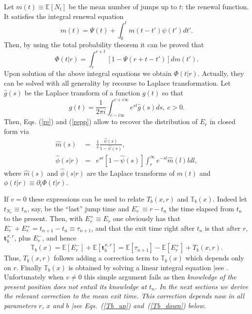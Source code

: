 \documentclass[english,aps,a4paper,twocolumn,showpacs,showkeys,amsfonts,amsmath,amssymb,amscd,nofootinbib]{revtex4}
\newcommand{\1}{\'\i}
\newcommand{\EE}{\mathbb{E}}
\newcommand{\TT}{\mathbb{T}}\newcommand{\FF}{\mathbb{F}}
\def\eq{\equiv}
\def\p{\partial}
\begin{document}
   Let  $m(t)\equiv \EE[N_t]$   be  the  mean
number of jumps up to $t$:  the renewal function. It satisfies
the integral renewal equation
\begin{equation}
m(t)=  \Psi(t) +\int_0^t  m(t-t')\psi(t')d  t'. \label{re}%
\end{equation}
 Then, by using the total
probability theorem   it can be proved  that
\begin{equation}
\Phi(t|r) = \int^{r+ t }_{r}\left[1- \Psi(r+ t-t')\right]d  m(t').
\label{repp}%
\end{equation}  Upon solution of the  above
  integral  equations we obtain $\Phi(t|r)$. Actually, they  can be solved
  with all generality
  by recourse to   Laplace
  transformation.   Let $\hat g(s)$ be   the Laplace
transform of a function $g(t)$ so that
\begin{equation}  g(t) =\frac{1}{2\pi i}
\int_{c-i\infty}^{c+i\infty} e^{ st} \hat g(s)  d  s,\ c>0.
\label{def_m}%
\end{equation}
  Then,    Eqs.  (\ref{re}) and (\ref{repp}) allow  to  recover the
  distribution of $E_r$ in closed form via
\begin{subequations}
\label{hat_phi} 
\begin{eqnarray}
\hat m(s)&=&\frac{1}{s} \frac{\hat\psi(s)}{1-\hat \psi(s)}, \\   
\hat \phi(s|r)&=&  e^{s  r } \left[1-\hat \psi(s)\right] \int_r^\infty e^{-sl} \hat m(l)l d  l, 
\end{eqnarray}
\end{subequations}
where   $ \hat m(s) $ and $  \hat \phi(s|r)$ are the Laplace transforms of  $m(t)$  and $\phi(t|r) \equiv \p_t \Phi(t|r)$.


 If $v=0$ these expressions can be used to relate $T_{b}(x,r)  $ and
 $\TT_{b}(x)$. Indeed  let $t_{N_r}\eq t_n$, say,  be the ``last'' jump time
   and  $E_r^-  \equiv r- t_n$     the time elapsed
  from  $t_n$     to the present. Then, with $E_r^+\equiv
 E_r$ one  obviously has that
 $E_r^-+E_r^+=t_{n+1}-t_n\equiv\tau_{n+1}$, and that the exit time right
after $t_n$ is that after $r$, $\mathbf{t}_b^{x,r}$,  plus $E_r^-$, and hence
 \begin{equation}\TT_{b}(x)=\EE [E_r^-]+
\EE[\mathbf{t}_b^{x,r}]=\EE[\tau_{n+1}]-\EE[E_r^+]+
T_{b}(x,r).\label{v=0}%
\end{equation} Thus,
 $T_{b}(x,r)
 $   follows    adding a   correction     term to $\TT_{b}(x)$ which  depends only on $r$. Finally $\TT_{b}(x)$
 is obtained by solving  a linear
 integral equation |see \cite{mmp05,mmpw06}.
Unfortunately when $v\ne 0$ this simple argument  fails  as
 then \it  knowledge of the present position does not entail its   knowledge
  at $t_n$\rm.
 In the next sections   we   derive  the relevant correction
 to
the mean
  exit time. This correction depends now in all parameters $r$, $x$ and $b$ |see Eqs.~(\ref{Tb_up}) and~(\ref{Tb_down})  below.
\end{document}
